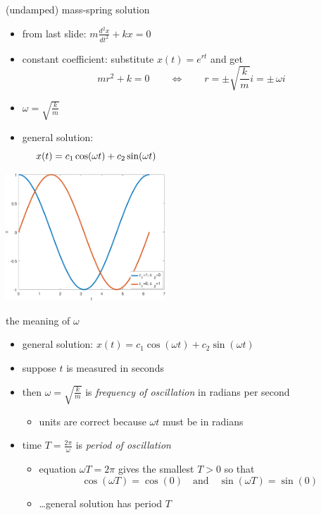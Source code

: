 \documentclass[dvipsnames,colorlinks]{beamer}
\begin{document}
\begin{frame}{(undamped) mass-spring solution}

\begin{itemize}
\item from last slide: $m \frac{d^2x}{dt^2} + k x = 0$
\item constant coefficient: substitute $x(t)=e^{rt}$ and get
    $$m r^2 + k = 0 \qquad \iff \qquad r = \pm \sqrt{\frac{k}{m}} i = \pm\, \omega i$$
\item \alert{$\omega = \sqrt{\frac{k}{m}}$}
\item general solution:
    $$x(t) = c_1 \cos(\omega t) + c_2 \sin(\omega t) \hspace{70mm}$$
\end{itemize}

\vspace{-20mm}
\hfill \includegraphics[width=0.45\textwidth]{figs/cossin}
\end{frame}


\begin{frame}{the meaning of $\omega$}

\begin{itemize}
\item general solution: $x(t) = c_1 \cos(\omega t) + c_2 \sin(\omega t)$
\item suppose $t$ is measured in seconds
\item then $\omega = \sqrt{\frac{k}{m}}$ is \alert{\emph{frequency of oscillation}} in radians per second
    \begin{itemize}
    \item units are correct because $\omega t$ must be in radians
    \end{itemize}
\item time \alert{$T = \frac{2\pi}{\omega}$} is \emph{period of oscillation}
    \begin{itemize}
    \item equation $\omega T=2\pi$ gives the smallest $T>0$ so that
        $$\cos(\omega T) = \cos(0) \quad \text{and} \quad \sin(\omega T) = \sin(0)$$
    \item \dots general solution has period $T$
    \end{itemize}
\end{itemize}
\end{frame}
\end{document}
